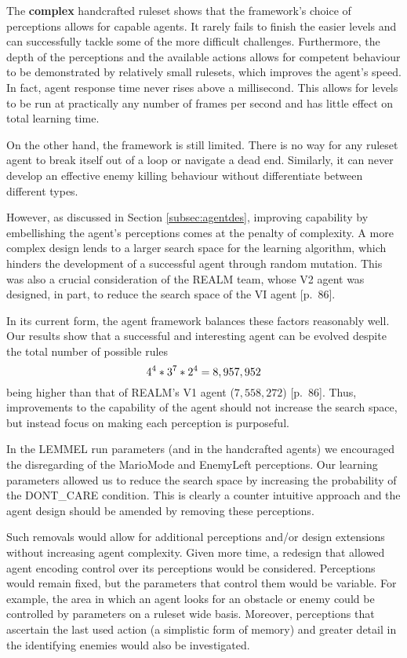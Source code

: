 The \textbf{complex} handcrafted ruleset shows that the framework's choice of perceptions allows for capable agents. It rarely fails to finish the easier levels and can successfully tackle some of the more difficult challenges. Furthermore, the depth of the perceptions and the available actions allows for competent behaviour to be demonstrated by relatively small rulesets, which improves the agent's speed. In fact, agent response time never rises above a millisecond. This allows for levels to be run at practically any number of frames per second and has little effect on total learning time.

On the other hand, the framework is still limited. There is no way for any ruleset agent to break itself out of a loop or navigate a dead end. Similarly, it can never develop an effective enemy killing behaviour without differentiate between different types.

However, as discussed in Section \ref{subsec:agentdes}, improving capability by embellishing the agent's perceptions comes at the penalty of complexity. A more complex design lends to a larger search space for the learning algorithm, which hinders the development of a successful agent through random mutation. This was also a crucial consideration of the REALM team, whose V2 agent was designed, in part, to reduce the search space of the VI agent \cite{realm}[p.~86].

In its current form, the agent framework balances these factors reasonably well. Our results show that a successful and interesting agent can be evolved despite the total number of possible rules
\[ \centering
4^4 * 3^7 * 2^4 = 8,957,952
\]
being higher than that of REALM's V1 agent ($7,558,272$) \cite{realm}[p.~86]. Thus, improvements to the capability of the agent should not increase the search space, but instead focus on making each perception is purposeful.

In the LEMMEL run parameters (and in the handcrafted agents) we encouraged the disregarding of the MarioMode and EnemyLeft perceptions. Our learning parameters allowed us to reduce the search space by increasing the probability of the {\footnotesize DONT\_CARE} condition. This is clearly a counter intuitive approach and the agent design should be amended by removing these perceptions. 

Such removals would allow for additional perceptions and/or design extensions without increasing agent complexity. Given more time, a redesign that allowed agent encoding control over its perceptions would be considered. Perceptions would remain fixed, but the parameters that control them would be variable. For example, the area in which an agent looks for an obstacle or enemy could be controlled by parameters on a ruleset wide basis. Moreover, perceptions that ascertain the last used action (a simplistic form of memory) and greater detail in the identifying enemies would also be investigated.


